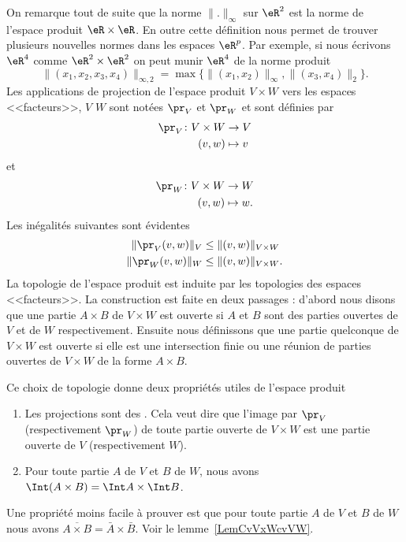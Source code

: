 On remarque tout de suite que la norme \( \|.\|_\infty\) sur \( \eR^2\) est la norme de l'espace produit \( \eR\times\eR\). En outre cette définition nous permet de trouver plusieurs nouvelles normes dans les espaces \( \eR^p\). Par exemple, si nous écrivons \( \eR^4\) comme \( \eR^2\times \eR^2\) on peut munir \( \eR^4\) de la norme produit
\[
	\|(x_1,x_2,x_3,x_4)\|_{\infty, 2}=\max\{\|(x_1,x_2)\|_\infty, \|(x_3,x_4)\|_2\}.
\]
Les applications de projection de l'espace produit \( V\times W\) vers les espaces <<facteurs>>, \( V\) \( W\) sont notées \( \pr_V\) et \( \pr_W\) et sont définies par
\begin{equation}
	\begin{aligned}
		\pr_V\colon V\times W & \to V     \\
		(v,w)                 & \mapsto v
	\end{aligned}
\end{equation}
et
\begin{equation}
	\begin{aligned}
		\pr_W\colon V\times W & \to W      \\
		(v,w)                 & \mapsto w.
	\end{aligned}
\end{equation}
Les inégalités suivantes sont évidentes
\begin{equation}
	\begin{aligned}[]
		\|\pr_V(v,w)\|_V & \leq \|(v,w)\|_{V\times W}  \\
		\|\pr_W(v,w)\|_W & \leq \|(v,w)\|_{V\times W}.
	\end{aligned}
\end{equation}
La topologie de l'espace produit est induite par les topologies des espaces <<facteurs>>. La construction est faite en deux passages : d'abord nous disons que une partie \( A\times B\) de \( V\times W\) est ouverte si \( A\) et \( B\) sont des parties ouvertes de \( V\) et de \( W\) respectivement.  Ensuite nous définissons que une partie quelconque de \( V\times W\) est ouverte si elle est une intersection finie ou une réunion de parties ouvertes de \( V\times W\) de la forme \( A\times B\).

Ce choix de topologie donne deux propriétés utiles de l'espace produit
\begin{enumerate}
	\item
	      Les projections sont des . Cela veut dire que l'image par \( \pr_V\) (respectivement \( \pr_W\)) de toute partie ouverte de \( V\times W\) est une partie ouverte de \( V\) (respectivement \( W\)).
	\item
	      Pour toute partie \( A\) de \( V\) et \( B\) de \( W\), nous avons \( \Int (A\times B)=\Int A\times \Int B\).\label{PgovlABeqbAbB}
\end{enumerate}
Une propriété moins facile à prouver est que pour toute partie \( A\) de \( V\) et \( B\) de \( W\) nous avons  \( \overline{A\times B}=\bar{A}\times \bar{B}\). Voir le lemme~\ref{LemCvVxWcvVW}.

